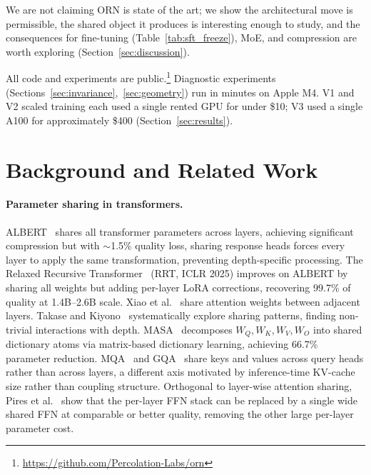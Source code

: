\documentclass[10pt,twocolumn]{article}
\begin{document}
\noindent We are not claiming ORN is state of the art; we show the architectural move is permissible, the shared object it produces is interesting enough to study, and the consequences for fine-tuning (Table~\ref{tab:sft_freeze}), MoE, and compression are worth exploring (Section~\ref{sec:discussion}).

\noindent All code and experiments are public.\footnote{\url{https://github.com/Percolation-Labs/orn}}
Diagnostic experiments (Sections~\ref{sec:invariance},~\ref{sec:geometry}) run in minutes on Apple M4.
V1 and V2 scaled training each used a single rented GPU for under \$10; V3 used a single A100 for approximately \$400 (Section~\ref{sec:results}).


\section{Background and Related Work}

\paragraph{Parameter sharing in transformers.}
ALBERT~\cite{lan2020albert} shares all transformer parameters across layers, achieving significant compression but with $\sim$1.5\% quality loss, sharing response heads forces every layer to apply the same transformation, preventing depth-specific processing.
The Relaxed Recursive Transformer~\cite{relaxedrecursive2025} (RRT, ICLR 2025) improves on ALBERT by sharing all weights but adding per-layer LoRA corrections, recovering 99.7\% of quality at 1.4B--2.6B scale.
Xiao et al.~\cite{xiao2019sharing} share attention weights between adjacent layers.
Takase and Kiyono~\cite{takase2021sharing} systematically explore sharing patterns, finding non-trivial interactions with depth.
MASA~\cite{masa2025} decomposes $W_Q, W_K, W_V, W_O$ into shared dictionary atoms via matrix-based dictionary learning, achieving 66.7\% parameter reduction.
MQA~\cite{shazeer2019mqa} and GQA~\cite{ainslie2023gqa} share keys and values across query heads rather than across layers, a different axis motivated by inference-time KV-cache size rather than coupling structure.
Orthogonal to layer-wise attention sharing, Pires et al.~\cite{onewideffn2023} show that the per-layer FFN stack can be replaced by a single wide shared FFN at comparable or better quality, removing the other large per-layer parameter cost.
\end{document}
